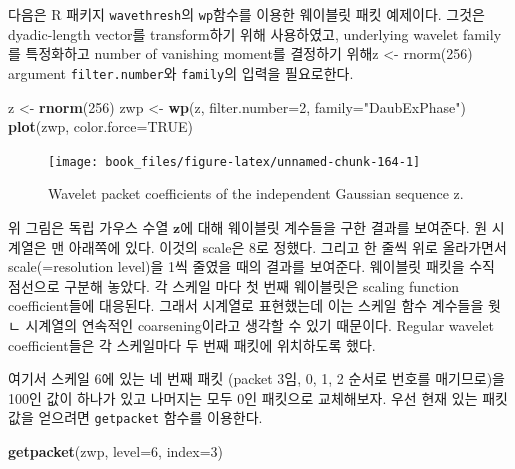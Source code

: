 \documentclass[b5paper,]{book}
\makeatletter
\newenvironment{Shaded}{\begin{snugshade}}{\end{snugshade}}
\newcommand{\KeywordTok}[1]{\textcolor[rgb]{0.13,0.29,0.53}{\textbf{{#1}}}}
\newcommand{\DataTypeTok}[1]{\textcolor[rgb]{0.13,0.29,0.53}{{#1}}}
\newcommand{\DecValTok}[1]{\textcolor[rgb]{0.00,0.00,0.81}{{#1}}}
\newcommand{\StringTok}[1]{\textcolor[rgb]{0.31,0.60,0.02}{{#1}}}
\newcommand{\OtherTok}[1]{\textcolor[rgb]{0.56,0.35,0.01}{{#1}}}
\newcommand{\NormalTok}[1]{{#1}}
\newenvironment{kframe}{%
\medskip{}
\setlength{\fboxsep}{.8em}
 \def\at@end@of@kframe{}%
 \ifinner\ifhmode%
  \def\at@end@of@kframe{\end{minipage}}%
  \begin{minipage}{\columnwidth}%
 \fi\fi%
 \def\FrameCommand##1{\hskip\@totalleftmargin \hskip-\fboxsep
 \colorbox{shadecolor}{##1}\hskip-\fboxsep
     \hskip-\linewidth \hskip-\@totalleftmargin \hskip\columnwidth}%
 \MakeFramed {\advance\hsize-\width
   \@totalleftmargin\z@ \linewidth\hsize
   \@setminipage}}%
 {\par\unskip\endMakeFramed%
 \at@end@of@kframe}
\renewenvironment{Shaded}{\begin{kframe}}{\end{kframe}}
\theoremstyle{definition}
\theoremstyle{definition}
\theoremstyle{definition}
\theoremstyle{remark}
\makeatother
\begin{document}
다음은 R 패키지 \texttt{wavethresh}의 \texttt{wp}함수를 이용한 웨이블릿
패킷 예제이다. 그것은 dyadic-length vector를 transform하기 위해
사용하였고, underlying wavelet family를 특정화하고 number of vanishing
moment를 결정하기 위해z \textless{}- rnorm(256) argument
\texttt{filter.number}와 \texttt{family}의 입력을 필요로한다.

\begin{Shaded}
\begin{Highlighting}[]
\NormalTok{z <-}\StringTok{ }\KeywordTok{rnorm}\NormalTok{(}\DecValTok{256}\NormalTok{)}
\NormalTok{zwp <-}\StringTok{ }\KeywordTok{wp}\NormalTok{(z, }\DataTypeTok{filter.number=}\DecValTok{2}\NormalTok{, }\DataTypeTok{family=}\StringTok{"DaubExPhase"}\NormalTok{)}
\KeywordTok{plot}\NormalTok{(zwp, }\DataTypeTok{color.force=}\OtherTok{TRUE}\NormalTok{)}
\end{Highlighting}
\end{Shaded}

\begin{figure}

{\centering \texttt{[image: book\_files/figure-latex/unnamed-chunk-164-1]} 

}

\caption{Wavelet packet coefficients of the independent Gaussian sequence z.}\label{fig:unnamed-chunk-164}
\end{figure}

위 그림은 독립 가우스 수열 \(\mathbf{z}\)에 대해 웨이블릿 계수들을 구한
결과를 보여준다. 원 시계열은 맨 아래쪽에 있다. 이것의 scale은 8로
정했다. 그리고 한 줄씩 위로 올라가면서 scale(=resolution level)을 1씩
줄였을 때의 결과를 보여준다. 웨이블릿 패킷을 수직 점선으로 구분해
놓았다. 각 스케일 마다 첫 번째 웨이블릿은 scaling function
coefficient들에 대응된다. 그래서 시계열로 표현했는데 이는 스케일 함수
계수들을 웟ㄴ 시계열의 연속적인 coarsening이라고 생각할 수 있기
때문이다. Regular wavelet coefficient들은 각 스케일마다 두 번째 패킷에
위치하도록 했다.

여기서 스케일 6에 있는 네 번째 패킷 (packet 3임, 0, 1, 2 순서로 번호를
매기므로)을 100인 값이 하나가 있고 나머지는 모두 0인 패킷으로
교체해보자. 우선 현재 있는 패킷 값을 얻으려면 \texttt{getpacket} 함수를
이용한다.

\begin{Shaded}
\begin{Highlighting}[]
\KeywordTok{getpacket}\NormalTok{(zwp, }\DataTypeTok{level=}\DecValTok{6}\NormalTok{, }\DataTypeTok{index=}\DecValTok{3}\NormalTok{)}
\end{Highlighting}
\end{Shaded}
\end{document}
